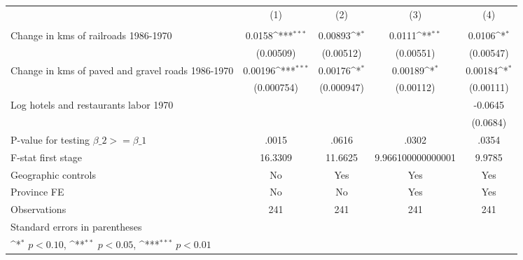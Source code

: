 {
\def\sym#1{\ifmmode^{#1}\else\(^{#1}\)\fi}
\begin{tabular}{l*{4}{c}}
\hline\hline
                &\multicolumn{1}{c}{(1)}&\multicolumn{1}{c}{(2)}&\multicolumn{1}{c}{(3)}&\multicolumn{1}{c}{(4)}\\
                &\multicolumn{1}{c}{}&\multicolumn{1}{c}{}&\multicolumn{1}{c}{}&\multicolumn{1}{c}{}\\
\hline
Change in kms of railroads 1986-1970&   0.0158\sym{***}&  0.00893\sym{*}  &   0.0111\sym{**} &   0.0106\sym{*}  \\
                &(0.00509)         &(0.00512)         &(0.00551)         &(0.00547)         \\
[1em]
Change in kms of paved and gravel roads 1986-1970&  0.00196\sym{***}&  0.00176\sym{*}  &  0.00189\sym{*}  &  0.00184\sym{*}  \\
                &(0.000754)         &(0.000947)         &(0.00112)         &(0.00111)         \\
[1em]
Log hotels and restaurants labor 1970&                  &                  &                  &  -0.0645         \\
                &                  &                  &                  & (0.0684)         \\
\hline
P-value for testing $\beta\_{2} >= \beta\_{1}$&    .0015         &    .0616         &    .0302         &    .0354         \\
F-stat first stage&  16.3309         &  11.6625         &9.966100000000001         &   9.9785         \\
Geographic controls&       No         &      Yes         &      Yes         &      Yes         \\
Province FE     &       No         &       No         &      Yes         &      Yes         \\
Observations    &      241         &      241         &      241         &      241         \\
\hline\hline
\multicolumn{5}{l}{\footnotesize Standard errors in parentheses}\\
\multicolumn{5}{l}{\footnotesize \sym{*} \(p<0.10\), \sym{**} \(p<0.05\), \sym{***} \(p<0.01\)}\\
\end{tabular}
}
